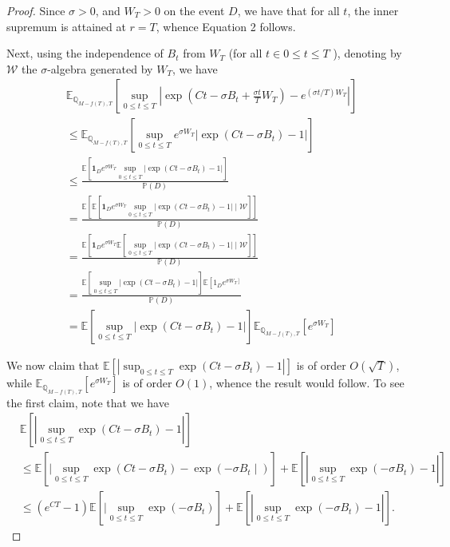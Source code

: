 \documentclass[10pt,a4paper]{amsart}
\begin{document}
\begin{proof}
Since $\sigma>0$, and $W_{T}>0$ on the event $D$, we have that for all $t$, the inner supremum is attained at $r=T$, whence Equation 2 follows.

Next, using the independence of $B_{t}$ from $W_{T}$ (for all $t \in 0 \leq t \leq T$ ), denoting by $\mathcal{W}$ the $\sigma$-algebra generated by $W_{T}$, we have
$$
\begin{aligned}
& \mathbb{E}_{\mathbb{Q}_{M-f(T), T}}\left[\sup _{0 \leq t \leq T}\left|\exp \left(C t-\sigma B_{t}+\frac{\sigma t}{T} W_{T}\right)-e^{(\sigma t / T) W_{T}}\right|\right] \\
& \leq \mathbb{E}_{\mathbb{Q}_{M-f(T), T}}\left[\sup _{0 \leq t \leq T} e^{\sigma W_{T}}\left|\exp \left(C t-\sigma B_{t}\right)-1\right|\right] \\
& \leq \frac{\mathbb{E}\left[\mathbf{1}_{D} e^{\sigma W_{T}} \sup _{0 \leq t \leq T}\left|\exp \left(C t-\sigma B_{t}\right)-1\right|\right]}{\mathbb{P}(D)} \\
& =\frac{\mathbb{E}\left[\mathbb{E}\left[\mathbf{1}_{D} e^{\sigma W_{T}} \sup _{0 \leq t \leq T}\left|\exp \left(C t-\sigma B_{t}\right)-1\right| \mid \mathcal{W}\right]\right]}{\mathbb{P}(D)} \\
& =\frac{\mathbb{E}\left[\mathbf{1}_{D} e^{\sigma W_{T}} \mathbb{E}\left[\sup _{0 \leq t \leq T}\left|\exp \left(C t-\sigma B_{t}\right)-1\right| \mid \mathcal{W}\right]\right]}{\mathbb{P}(D)} \\
& =\frac{\mathbb{E}\left[\sup _{0 \leq t \leq T}\left|\exp \left(C t-\sigma B_{t}\right)-1\right|\right] \mathbb{E}\left[1_{D} e^{\left.\sigma W_{T}\right]}\right.}{\mathbb{P}(D)} \\
& =\mathbb{E}\left[\sup _{0 \leq t \leq T}\left|\exp \left(C t-\sigma B_{t}\right)-1\right|\right] \mathbb{E}_{\mathbb{Q}_{M-f(T), T}}\left[e^{\sigma W_{T}}\right]
\end{aligned}
$$

We now claim that $\mathbb{E}\left[\left|\sup _{0 \leq t \leq T} \exp \left(C t-\sigma B_{t}\right)-1\right|\right]$ is of order $O(\sqrt{T})$, while $\mathbb{E}_{\mathbb{Q}_{M-f(T), T}}\left[e^{\sigma W_{T}}\right]$ is of order $O(1)$, whence the result would follow. To see the first claim, note that we have
$$
\begin{aligned}
& \mathbb{E}\left[\left|\sup _{0 \leq t \leq T} \exp \left(C t-\sigma B_{t}\right)-1\right|\right] \\
& \leq \mathbb{E}\left[\mid \sup _{0 \leq t \leq T} \exp \left(C t-\sigma B_{t}\right)-\exp \left(-\sigma B_{t} \mid\right)\right]+\mathbb{E}\left[\left|\sup _{0 \leq t \leq T} \exp \left(-\sigma B_{t}\right)-1\right|\right] \\
& \leq\left(e^{C T}-1\right) \mathbb{E}\left[\mid \sup _{0 \leq t \leq T} \exp \left(-\sigma B_{t}\right)\right]+\mathbb{E}\left[\left|\sup _{0 \leq t \leq T} \exp \left(-\sigma B_{t}\right)-1\right|\right] .
\end{aligned}
$$


\end{proof}
\end{document}
